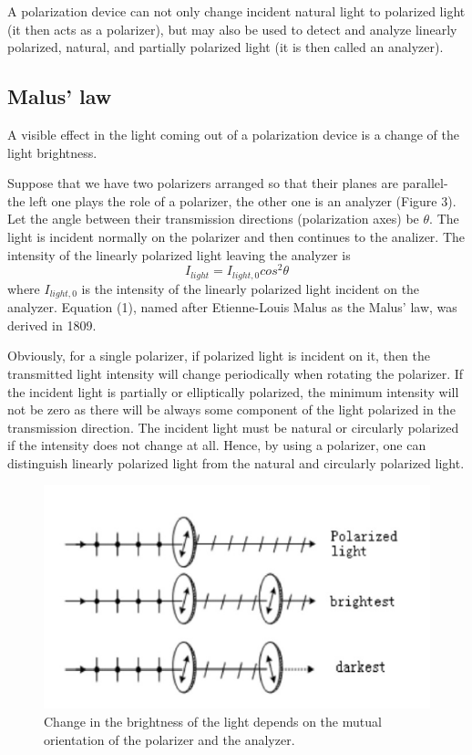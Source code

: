 \documentclass{article}
\begin{document}
A polarization device can not only change incident natural light to polarized light (it then acts as a polarizer), but may also be used to detect and analyze linearly polarized, natural, and partially polarized light (it is then called an analyzer).

\subsection{Malus' law}
A visible effect in the light coming out of a polarization device is a change of the light brightness.

Suppose that we have two polarizers arranged so that their planes are parallel- the left one plays the role of a polarizer, the other one is an analyzer (Figure 3). Let the angle between their transmission directions (polarization axes) be $ \theta $. The light is incident normally on the polarizer and then continues to the analizer. The intensity of the linearly polarized light leaving the analyzer is
\begin{equation}
	I_{light}=I_{light,0}cos^2\theta
\end{equation}
where $ I_{light,0} $ is the intensity of the linearly polarized light incident on the analyzer. Equation (1), named after Etienne-Louis Malus as the Malus' law, was derived in 1809.

Obviously, for a single polarizer, if polarized light is incident on it, then the transmitted light intensity will change periodically when rotating the polarizer. If the incident light is partially or elliptically polarized, the minimum intensity will not be zero as there will be always some component of the light polarized in the transmission direction. The incident light must be natural or circularly polarized if the intensity does not change at all. Hence, by using a polarizer, one can distinguish linearly polarized light from the natural and circularly polarized light.

\begin{figure}[H]
	\centering
	\includegraphics[scale=0.5]{3.png}
	\caption{Change in the brightness of the light depends on the mutual orientation of the polarizer and the analyzer.}
\end{figure}
\end{document}
